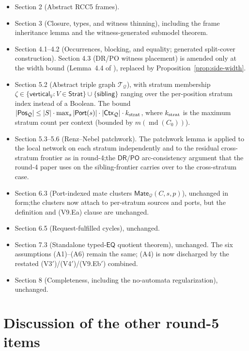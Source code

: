 \documentclass[11pt]{article}
\theoremstyle{definition}
\theoremstyle{remark}
\newcommand{\DR}{\mathsf{DR}}
\newcommand{\PO}{\mathsf{PO}}
\newcommand{\EQ}{\mathsf{EQ}}
\newcommand{\Ctx}{\mathsf{Ctx}}
\newcommand{\Pos}{\mathsf{Pos}}
\newcommand{\Port}{\mathsf{Port}}
\newcommand{\Mate}{\mathsf{Mate}}
\newcommand{\Q}{\mathcal{Q}}
\newcommand{\T}{\mathcal{T}}
\newcommand{\md}{\operatorname{md}}
\newcommand{\Stratum}{\mathsf{Strat}}
\begin{document}
\begin{itemize}
\item Section 2 (Abstract RCC5 frames).
\item Section 3 (Closure, types, and witness thinning), including the
  frame inheritance lemma and the witness-generated submodel theorem.
\item Section 4.1--4.2 (Occurrences, blocking, and equality;
  generated split-cover construction).  Section 4.3 (DR/PO witness
  placement) is amended only at the width bound (Lemma~4.4 of
  \cite{GPT55Repaired}), replaced by Proposition~\ref{prop:side-width}.
\item Section 5.2 (Abstract triple graph $\T_\Q$), with stratum
  membership $\zeta\in\{\mathsf{vertical}_V : V\in\Stratum\}\cup\{\mathsf{sibling}\}$
  ranging over the per-position stratum index instead of a Boolean.
  The bound $|\Pos_\Q|\leq |S|\cdot\max_s|\Port(s)|\cdot|\Ctx_\Q|\cdot
  k_{\rm strat}$, where $k_{\rm strat}$ is the maximum stratum count
  per context (bounded by $m(\md(C_0))$).
\item Section 5.3--5.6 (Renz--Nebel patchwork).  The patchwork lemma
  is applied to the local network on each stratum independently and
  to the residual cross-stratum frontier as in round-4;\@ the
  $\DR/\PO$ arc-consistency argument that the round-4 paper uses on
  the sibling-frontier carries over to the cross-stratum case.
\item Section 6.3 (Port-indexed mate clusters $\Mate_\Q(C,s,p)$),
  unchanged in form;\@ the clusters now attach to per-stratum sources
  and ports, but the definition and (V9.Ea) clause are unchanged.
\item Section 6.5 (Request-fulfilled cycles), unchanged.
\item Section 7.3 (Standalone typed-$\EQ$ quotient theorem),
  unchanged.  The six assumptions (A1)--(A6) remain the same;\@
  (A4) is now discharged by the restated (V3$'$)/(V4$'$)/(V9.Eb$'$)
  combined.
\item Section 8 (Completeness, including the no-automata
  regularization), unchanged.
\end{itemize}

\section{Discussion of the other round-5 items}
\label{sec:other-round5}
\end{document}
